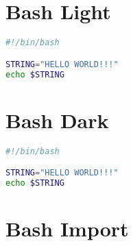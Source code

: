 \section{Bash Light}

\begin{lstlisting}[language=bash, style=customStyleBashLight, caption=Snippet title]
#!/bin/bash

STRING="HELLO WORLD!!!"
echo $STRING 
\end{lstlisting}

\section{Bash Dark}

\begin{lstlisting}[language=bash, style=customStyleBashDark, caption=Snippet title]
#!/bin/bash

STRING="HELLO WORLD!!!"
echo $STRING 
\end{lstlisting}

\section{Bash Import}

